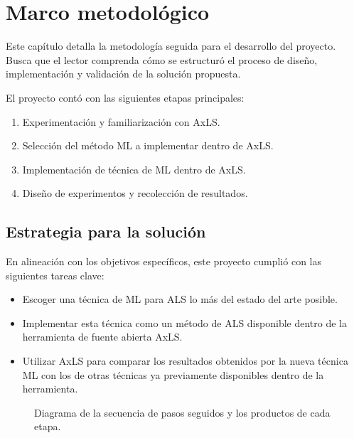 \chapter{Marco metodológico}

Este capítulo detalla la metodología seguida para el desarrollo del
proyecto. Busca que el lector comprenda cómo se estructuró el proceso
de diseño, implementación y validación de la solución propuesta.

El proyecto contó con las siguientes etapas principales:

\begin{enumerate}
  \item Experimentación y familiarización con AxLS.
  \item Selección del método ML a implementar dentro de AxLS.
  \item Implementación de técnica de ML dentro de AxLS.
  \item Diseño de experimentos y recolección de resultados.
\end{enumerate}


\section{Estrategia para la solución}

En alineación con los objetivos específicos, este proyecto cumplió con las
siguientes tareas clave:

\begin{itemize}
  \item Escoger una técnica de ML para ALS lo más del estado del arte posible.
  \item Implementar esta técnica como un método de ALS disponible dentro de la
    herramienta de fuente abierta AxLS.
  \item Utilizar AxLS para comparar los resultados obtenidos por la nueva
    técnica ML con los de otras técnicas ya previamente disponibles dentro de
    la herramienta.
\end{itemize}


\begin{figure}[htb]
  \begin{center}
    
  \end{center}
  \caption{Diagrama de la secuencia de pasos seguidos y los productos de cada etapa.}
  \label{fig:diagrama_metodológico}
\end{figure}

